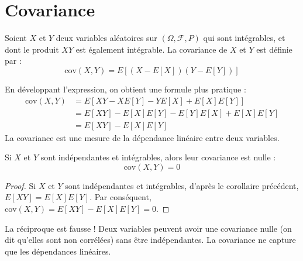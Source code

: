 \section{Covariance}
\begin{definition}
Soient $X$ et $Y$ deux variables aléatoires sur $(\Omega, \mathcal{F}, P)$ qui sont intégrables, et dont le produit $XY$ est également intégrable.
La covariance de $X$ et $Y$ est définie par :
\[ \text{cov}(X,Y) = E[(X-E[X])(Y-E[Y])] \]
\end{definition}
En développant l'expression, on obtient une formule plus pratique :
\begin{align*}
\text{cov}(X,Y) &= E[XY - X E[Y] - Y E[X] + E[X]E[Y]] \\
&= E[XY] - E[X]E[Y] - E[Y]E[X] + E[X]E[Y] \\
&= E[XY] - E[X]E[Y]
\end{align*}
La covariance est une mesure de la dépendance linéaire entre deux variables.
\begin{proposition}
Si $X$ et $Y$ sont indépendantes et intégrables, alors leur covariance est nulle :
\[ \text{cov}(X,Y) = 0 \]
\end{proposition}
\begin{proof}
Si $X$ et $Y$ sont indépendantes et intégrables, d'après le corollaire précédent, $E[XY] = E[X]E[Y]$. Par conséquent, $\text{cov}(X,Y) = E[XY] - E[X]E[Y] = 0$.
\end{proof}
\begin{remark}
La réciproque est fausse ! Deux variables peuvent avoir une covariance nulle (on dit qu'elles sont non corrélées) sans être indépendantes. La covariance ne capture que les dépendances linéaires.
\end{remark}
